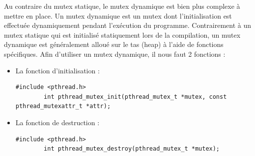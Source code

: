 Au contraire du mutex statique, le mutex dynamique est bien plus complexe à mettre en place. Un mutex dynamique est un mutex dont l'initialisation est effectuée dynamiquement pendant l'exécution du programme. Contrairement à un mutex statique qui est initialisé statiquement lors de la compilation, un mutex dynamique est généralement alloué sur le tas (heap) à l'aide de fonctions spécifiques. Afin d'utiliser un mutex dynamique, il nous faut 2 fonctions :
\\ 
\begin{itemize}
    \item La fonction d'initialisation : 
    \begin{lstlisting}[title = Initialisation mutex dynamique]
    #include <pthread.h>
        int pthread_mutex_init(pthread_mutex_t *mutex, const pthread_mutexattr_t *attr);
    \end{lstlisting}
    \vspace{\baselineskip}
    \item La fonction de destruction : 
    \begin{lstlisting}[title = Destruction mutex dynamique]
    #include <pthread.h>
        int pthread_mutex_destroy(pthread_mutex_t *mutex);
    \end{lstlisting}    
\end{itemize}
\vspace{\baselineskip}

